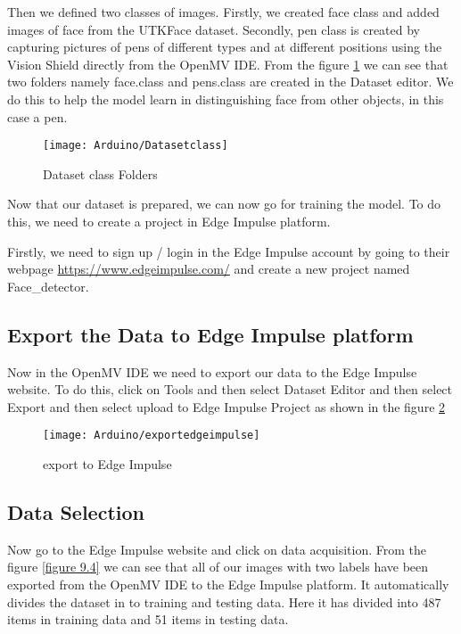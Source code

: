 Then we defined two classes of images. Firstly,  we created face class and added images of face from the UTKFace dataset. Secondly, pen class is created by capturing pictures of pens of different types and at different positions using the Vision Shield directly from the OpenMV IDE. From the figure \ref{figure 9.2} we can see that two folders namely face.class and pens.class are created in the Dataset editor. We do this to help the model learn in distinguishing face from other objects, in this case a pen.

\begin{figure}
	\centering
	\texttt{[image: Arduino/Datasetclass]}
	\caption{Dataset class Folders}
	\label{figure 9.2}
\end{figure}

Now that our dataset is prepared, we can now go for training the model. To do this,  we need to create a project in Edge Impulse platform. 

Firstly, we need to sign up / login in the Edge Impulse account by going to their webpage \url{https://www.edgeimpulse.com/} and create a new project named Face\_detector.


\subsection{Export the Data to Edge Impulse platform}

Now in the OpenMV IDE we need to export our data to the Edge Impulse website. To do this, click on Tools and then select Dataset Editor and then select Export and then select upload to Edge Impulse Project as shown in the figure \ref{figure 9.3}

\begin{figure}
	\centering
	\texttt{[image: Arduino/exportedgeimpulse]}
	\caption{export to Edge Impulse}
	\label{figure 9.3}
\end{figure}

\subsection{Data Selection}

Now go to the Edge Impulse website and click on data acquisition.  From the figure \ref{figure 9.4} we can see that all of our images with two labels have been exported from the OpenMV IDE to the Edge Impulse platform. It automatically divides the dataset in to training and testing data. Here it has divided into 487 items in training data and 51 items in testing data.

